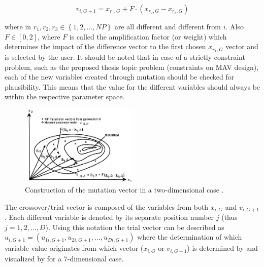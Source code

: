 
\begin{equation} \label{eq:mutation vector}
v_{i,G+1}=x_{r_{1},G}+F\cdot\left(x_{r_{2},G}-x_{r_{3},G}\right)
\end{equation}



\noindent where in  $r_{1}, r_{2},r_{3}\in \left\lbrace 1,2,\dotsc,NP \right\rbrace$ are all different and different from $i$. Also $F\in \left[0,2 \right]$, where $F$ is called the amplification factor (or weight) which determines the impact of the difference vector to the first chosen $x_{r_{1},G}$ vector and is selected by the user. It should be noted that in case of a strictly constraint problem, such as the proposed thesis topic problem (constraints on \ac{MAV} design), each of the new variables created through mutation should be checked for plausibility. This means that the value for the different variables should always be within the respective parameter space.  

\begin{figure}[!ht]
\centering
\includegraphics[width=0.5\textwidth]{figures/optimisation/mut_vec_storn1997differential.jpg}
\caption{Construction of the mutation vector in a two-dimensional case \cite{storn1997differential}.}
\label{fig:mut_vec_storn1997differential}
\end{figure}

The crossover/trial vector is composed of the variables from both $x_{i,G}$ and $v_{i,G+1}$. Each different variable is denoted by its separate position number $j$ (thus $j=1,2,\dotsc,D$). Using this notation the trial vector can be described as $u_{i,G+1}=\left(u_{1i,G+1},u_{2i,G+1},\dotsc,u_{Di,G+1} \right)$ where the determination of which variable value originates from which vector ($x_{i,G}$ or $v_{i,G+1}$) is determined by  and visualized by  for a 7-dimensional case.

